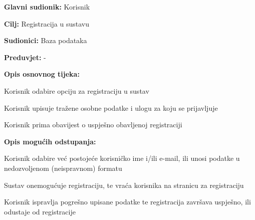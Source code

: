 					\noindent {}
					\begin{packed_item}
	
						\item \textbf{Glavni sudionik: }Korisnik
						\item  \textbf{Cilj:} Registracija u sustavu
						\item  \textbf{Sudionici:} Baza podataka
						\item  \textbf{Preduvjet:} -
						\item  \textbf{Opis osnovnog tijeka:}
						
						\item[] \begin{packed_enum}
	
							\item Korisnik odabire opciju za registraciju u sustav
							\item Korisnik upisuje tražene osobne podatke i ulogu za koju se prijavljuje
							\item Korisnik prima obavijest o uspješno obavljenoj registraciji
						\end{packed_enum}
						
						\item  \textbf{Opis mogućih odstupanja:}
						
						\item[] \begin{packed_item}
	
							\item[2.a] Korisnik odabire već postojeće korisničko ime i/ili e-mail, ili unosi podatke u nedozvoljenom (neispravnom) formatu
							\item[] \begin{packed_enum}
								
								\item Sustav onemogućuje registraciju, te vraća korisnika na stranicu za registraciju
								\item Korisnik ispravlja pogrešno upisane podatke te registracija završava uspješno, ili odustaje od registracije
								
							\end{packed_enum}
							
							
						\end{packed_item}
					\end{packed_item}
					
